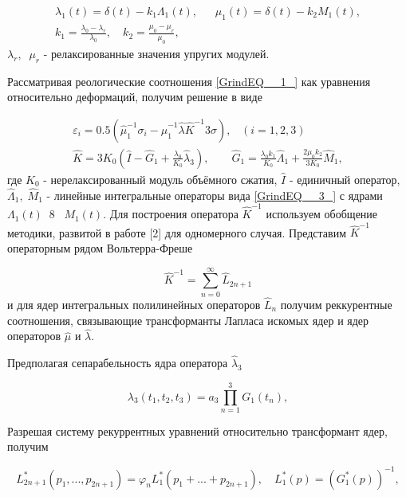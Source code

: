 \begin{equation} \label{GrindEQ__4_} \begin{array}{l} {\lambda _{1} (t)=\delta (t)-k_{1} \Lambda _{1} (t),\quad \; \; \mu _{1} (t)=\delta (t)-k_{2} M_{1} (t),} \\ {k_{1} =\frac{\lambda _{0} -\lambda _{r} }{\lambda _{0} } ,\quad k_{2} =\frac{\mu _{0} -\mu _{r} }{\mu _{0} } ,\quad } \end{array} \end{equation}
$\lambda _{r} ,\; \; \mu _{r} $ - релаксированные значения упругих модулей.

 Рассматривая реологические соотношения \eqref{GrindEQ__1_} как уравнения относительно деформаций, получим решение в виде

\begin{equation} \label{GrindEQ__5_} \begin{array}{l} {\varepsilon _{i} =0.5(\hat{\mu }_{1} ^{-1} \sigma _{i} -\hat{\mu }_{1} ^{-1} \hat{\lambda }\hat{K}^{-1} 3\sigma ),\; \; \; (i=1,2,3)} \\ {\hat{K}=3K_{0} \left(\hat{I}-\hat{G}_{1} +\frac{\lambda _{0} }{K_{0} } \hat{\lambda }_{3} \right),\quad \quad \hat{G}_{1} =\frac{\lambda _{0} k_{1} }{K_{0} } \hat{\Lambda }_{1} +\frac{2\mu _{0} k_{2} }{3K_{0} } \hat{M}_{1} ,} \end{array} \end{equation}
где $K_{0} $ - нерелаксированный модуль объёмного сжатия, $\hat{I}$ - единичный оператор, $\hat{\Lambda }_{1} ,\; \hat{M}_{1} $ - линейные интегральные операторы вида \eqref{GrindEQ__3_} с ядрами $\Lambda _{1} (t)\; \; 8\; \; \; M_{1} (t)$.  Для построения оператора $\hat{K}^{-1} $ используем обобщение методики, развитой в работе [2] для одномерного случая. Представим $\hat{K}^{-1} $ операторным рядом Вольтерра-Фреше

\[\hat{K}^{-1} =\sum _{n=0}^{\infty }\hat{L}_{2n+1}  \]
и для ядер интегральных полилинейных операторов $\hat{L}_{n} $ получим реккурентные соотношения, связывающие трансформанты Лапласа искомых ядер и ядер операторов $\hat{\mu }$ и $\hat{\lambda }$.

 Предполагая сепарабельность ядра оператора $\hat{\lambda }_{3} $

\[\lambda _{3} (t_{1} ,t_{2} ,t_{3} )=a_{3} \prod _{n=1}^{3}G_{1}  (t_{n} ),\]

Разрешая систему рекуррентных уравнений относительно трансформант ядер, получим

\begin{equation} \label{GrindEQ__6_} L^{*} _{2n+1} (p_{1} ,...,p_{2n+1} )=\varphi _{n} L_{1}^{*} (p_{1} +...+p_{2n+1} ),\quad L_{1}^{*} (p)=\left(G_{1}^{*} (p)\right)^{-1} , \end{equation}

